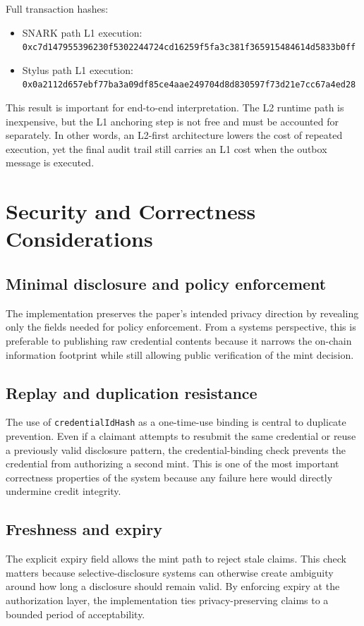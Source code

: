 \documentclass[11pt]{article}
\begin{document}
Full transaction hashes:

\begin{itemize}
  \item SNARK path L1 execution:\\
  \nolinkurl{0xc7d147955396230f5302244724cd16259f5fa3c381f365915484614d5833b0ff}
  \item Stylus path L1 execution:\\
  \nolinkurl{0x0a2112d657ebf77ba3a09df85ce4aae249704d8d830597f73d21e7cc67a4ed28}
\end{itemize}

This result is important for end-to-end interpretation. The L2 runtime path is inexpensive, but the L1 anchoring step is not free and must be accounted for separately. In other words, an L2-first architecture lowers the cost of repeated execution, yet the final audit trail still carries an L1 cost when the outbox message is executed.

\section{Security and Correctness Considerations}

\subsection{Minimal disclosure and policy enforcement}
The implementation preserves the paper's intended privacy direction by revealing only the fields needed for policy enforcement. From a systems perspective, this is preferable to publishing raw credential contents because it narrows the on-chain information footprint while still allowing public verification of the mint decision.

\subsection{Replay and duplication resistance}
The use of \texttt{credentialIdHash} as a one-time-use binding is central to duplicate prevention. Even if a claimant attempts to resubmit the same credential or reuse a previously valid disclosure pattern, the credential-binding check prevents the credential from authorizing a second mint. This is one of the most important correctness properties of the system because any failure here would directly undermine credit integrity.

\subsection{Freshness and expiry}
The explicit expiry field allows the mint path to reject stale claims. This check matters because selective-disclosure systems can otherwise create ambiguity around how long a disclosure should remain valid. By enforcing expiry at the authorization layer, the implementation ties privacy-preserving claims to a bounded period of acceptability.
\end{document}
